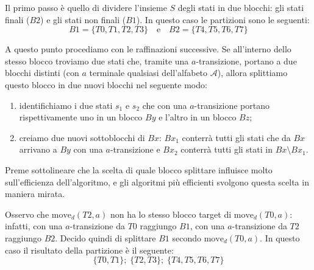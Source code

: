 \documentclass[class=book, crop=false, oneside, 12pt]{standalone}
\begin{document}
Il primo passo è quello di dividere l'insieme \(S\) degli stati in due blocchi: gli stati finali (\(B2\)) e gli stati non finali (\(B1\)).
In questo caso le partizioni sono le seguenti:
\begin{equation*}
    B1 = \{T0,T1,T2,T3\} \quad \textrm{e} \quad B2 = \{T4,T5,T6,T7\}
\end{equation*}

A questo punto procediamo con le raffinazioni successive. Se all'interno dello stesso blocco troviamo due stati che, tramite una \(a\)-transizione, portano a due blocchi distinti (con \(a\) terminale qualsiasi dell'alfabeto \(\mathcal{A}\)), allora splittiamo questo blocco in due nuovi blocchi nel seguente modo:
\begin{enumerate}
    \item identifichiamo i due stati \(s_1\) e \(s_2\) che con una \(a\)-transizione portano rispettivamente uno in un blocco \(By\) e l'altro in un blocco \(Bz\);
    \item creiamo due nuovi sottoblocchi di \(Bx\): \(Bx_{1}\) conterrà tutti gli stati che da \(Bx\) arrivano a \(By\) con una \(a\)-transizione e \(Bx_{2}\) conterrà tutti gli stati in \(Bx \setminus Bx_{1}\).
\end{enumerate} 
Preme sottolineare che la scelta di quale blocco splittare influisce molto sull'efficienza dell'algoritmo, e gli algoritmi più efficienti svolgono questa scelta in maniera mirata.

Osservo che \(\textrm{move}_d (T2,a)\) non ha lo stesso blocco target di \(\textrm{move}_d (T0,a) \): infatti, con una \(a\)-transizione da \(T0\) raggiungo \(B1\), con una \(a\)-transizione da \(T2\) raggiungo \(B2\). Decido quindi di splittare \(B1\) secondo \(\textrm{move}_d (T0,a) \). In questo caso il risultato della partizione è il seguente:
\begin{equation*}
    \{T0, T1\};\; \{T2, T3\};\; \{T4,T5,T6,T7\}
\end{equation*}
\end{document}
